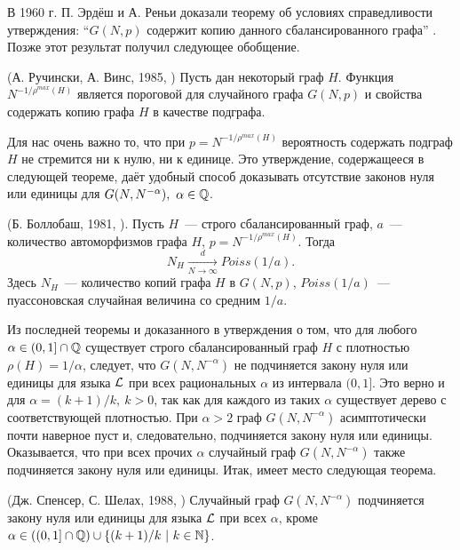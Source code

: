В 1960 г. П. Эрдёш и А. Реньи
доказали теорему об условиях справедливости утверждения: ``$G(N, p)$ содержит копию данного сбалансированного графа'' \cite{erdHos1976evolution}. 
Позже этот результат получил следующее обобщение.\\
\begin{theorem} (А. Ручински, А. Винс, 1985, \cite{rucinski1985balanced}) 
\label{th:ruchinski}
Пусть дан некоторый граф $H$.
Функция $N^{-1/\rho^{max}(H)}$ является пороговой для случайного графа $G(N,p)$ и свойства содержать копию графа $H$ в качестве подграфа.
\end{theorem}


Для нас очень важно то, что при $p = N^{-1/\rho^{max}(H)}$ вероятность содержать подграф $H$ не стремится ни к нулю, ни к единице.
Это утверждение, содержащееся в следующей теореме, даёт удобный способ доказывать отсутствие законов нуля или единицы для $G(N, N^{-\alpha}), ~\alpha \in \mathbb {Q}$.

\begin{theorem} (Б. Боллобаш, 1981, \cite{bollobas1981threshold}). 
\label{th:bollobash}
Пусть $H$~--- строго сбалансированный граф, $a$~--- количество автоморфизмов графа $H$, $p = N^{-1/ \rho^{max}(H)}$.
Тогда
\[N_H \xrightarrow[N\rightarrow \infty]{d} Poiss(1/a). \]
Здесь $N_H$~--- количество копий графа $H$ в $G(N, p)$, $Poiss(1/a)$~--- пуассоновская случайная величина со средним $1/a$.
\end{theorem}
Из последней теоремы и доказанного в \cite{rucinski1986strongly} утверждения о том, что для любого $\alpha \in (0,1] \cap \mathbb {Q}$ существует строго сбалансированный граф $H$ с плотностью $\rho(H) = 1/\alpha$, следует, что $G(N,N^{-\alpha})$ не подчиняется закону нуля или единицы для языка $\mathcal{L}$ при всех рациональных $\alpha$ из интервала $(0,1]$.
Это верно и для $\alpha = (k+1)/k,~ k > 0$, так как для каждого из таких $\alpha$ существует дерево с соответствующей плотностью.
При $\alpha > 2$ граф $G(N, N^{-\alpha})$ асимптотически почти наверное пуст и, следовательно, подчиняется закону нуля или единицы.
Оказывается, что при всех прочих $\alpha$ случайный граф $G(N, N^{-\alpha})$ также подчиняется закону нуля или единицы.
Итак, имеет место следующая теорема.
\begin{theorem} (Дж. Спенсер, С. Шелах, 1988, \cite{shelah1988zero})
\label{th:spencer}
Случайный граф $G(N, N^{-\alpha})$ подчиняется закону нуля или единицы для языка $\mathcal{L}$ при всех $\alpha$, кроме $\alpha \in \left((0,1] \cap \mathbb {Q} \right) \cup \{(k+1)/k ~|~ k \in \mathbb {N} \}$.
\end{theorem}

